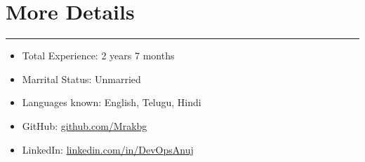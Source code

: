 \documentclass[a4paper,11pt]{article}
\newcommand{\sectitle}[1]{
    \vspace{1.5ex}
    \section{#1}
    \vspace{-3ex}
    \noindent\rule{\textwidth}{0.7pt}
    \vspace{-4ex}
}
\begin{document}
\sectitle{More Details}

\begin{itemize}
 \item {Total Experience:} 2 years 7 months
    \item {Marrital Status:} Unmarried
    \item {Languages known:} English, Telugu, Hindi
    
     \item {GitHub:} \href{https://github.com/mrakbg}{github.com/Mrakbg}
    \item {LinkedIn:} \href{https://www.linkedin.com/in/DevOpsAnuj}{linkedin.com/in/DevOpsAnuj}
\end{itemize}
\end{document}
